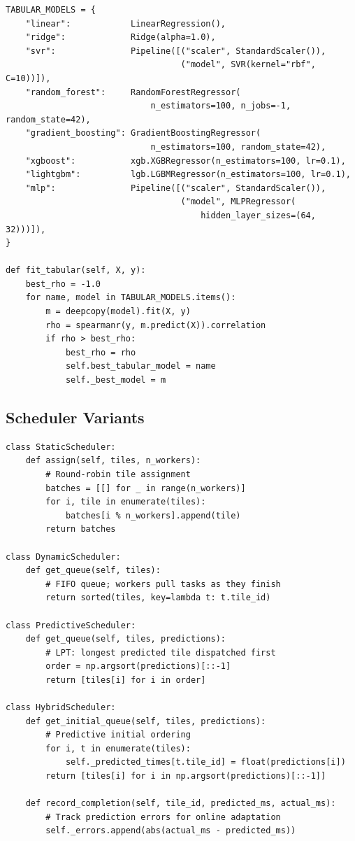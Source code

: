 \documentclass[12pt,a4paper]{article}
\begin{document}
\begin{lstlisting}[caption={Tabular model registry (\texttt{src/predictor.py}).}, label=lst:predictor]
TABULAR_MODELS = {
    "linear":            LinearRegression(),
    "ridge":             Ridge(alpha=1.0),
    "svr":               Pipeline([("scaler", StandardScaler()),
                                   ("model", SVR(kernel="rbf", C=10))]),
    "random_forest":     RandomForestRegressor(
                             n_estimators=100, n_jobs=-1, random_state=42),
    "gradient_boosting": GradientBoostingRegressor(
                             n_estimators=100, random_state=42),
    "xgboost":           xgb.XGBRegressor(n_estimators=100, lr=0.1),
    "lightgbm":          lgb.LGBMRegressor(n_estimators=100, lr=0.1),
    "mlp":               Pipeline([("scaler", StandardScaler()),
                                   ("model", MLPRegressor(
                                       hidden_layer_sizes=(64, 32)))]),
}

def fit_tabular(self, X, y):
    best_rho = -1.0
    for name, model in TABULAR_MODELS.items():
        m = deepcopy(model).fit(X, y)
        rho = spearmanr(y, m.predict(X)).correlation
        if rho > best_rho:
            best_rho = rho
            self.best_tabular_model = name
            self._best_model = m
\end{lstlisting}

\subsection{Scheduler Variants}

\begin{lstlisting}[caption={Four scheduler classes (\texttt{src/scheduler.py}).}, label=lst:schedulers]
class StaticScheduler:
    def assign(self, tiles, n_workers):
        # Round-robin tile assignment
        batches = [[] for _ in range(n_workers)]
        for i, tile in enumerate(tiles):
            batches[i % n_workers].append(tile)
        return batches

class DynamicScheduler:
    def get_queue(self, tiles):
        # FIFO queue; workers pull tasks as they finish
        return sorted(tiles, key=lambda t: t.tile_id)

class PredictiveScheduler:
    def get_queue(self, tiles, predictions):
        # LPT: longest predicted tile dispatched first
        order = np.argsort(predictions)[::-1]
        return [tiles[i] for i in order]

class HybridScheduler:
    def get_initial_queue(self, tiles, predictions):
        # Predictive initial ordering
        for i, t in enumerate(tiles):
            self._predicted_times[t.tile_id] = float(predictions[i])
        return [tiles[i] for i in np.argsort(predictions)[::-1]]

    def record_completion(self, tile_id, predicted_ms, actual_ms):
        # Track prediction errors for online adaptation
        self._errors.append(abs(actual_ms - predicted_ms))
\end{lstlisting}
\end{document}
